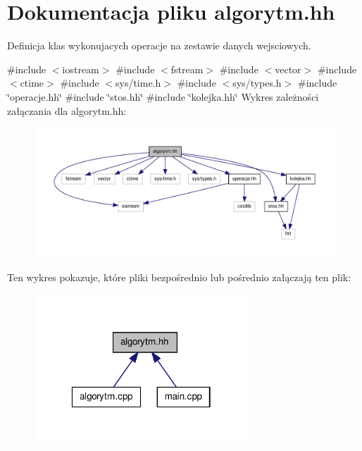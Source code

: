 \hypertarget{algorytm_8hh}{\section{\-Dokumentacja pliku algorytm.\-hh}
\label{algorytm_8hh}
}


\-Definicja klas wykonujacych operacje na zestawie danych wejsciowych.  


{\ttfamily \#include $<$iostream$>$}\*
{\ttfamily \#include $<$fstream$>$}\*
{\ttfamily \#include $<$vector$>$}\*
{\ttfamily \#include $<$ctime$>$}\*
{\ttfamily \#include $<$sys/time.\-h$>$}\*
{\ttfamily \#include $<$sys/types.\-h$>$}\*
{\ttfamily \#include \char`\"{}operacje.\-hh\char`\"{}}\*
{\ttfamily \#include \char`\"{}stos.\-hh\char`\"{}}\*
{\ttfamily \#include \char`\"{}kolejka.\-hh\char`\"{}}\*
\-Wykres zależności załączania dla algorytm.\-hh\-:\nopagebreak
\begin{figure}[H]
\begin{center}
\leavevmode
\includegraphics[width=350pt]{algorytm_8hh__incl}
\end{center}
\end{figure}
\-Ten wykres pokazuje, które pliki bezpośrednio lub pośrednio załączają ten plik\-:\nopagebreak
\begin{figure}[H]
\begin{center}
\leavevmode
\includegraphics[width=226pt]{algorytm_8hh__dep__incl}
\end{center}
\end{figure}
